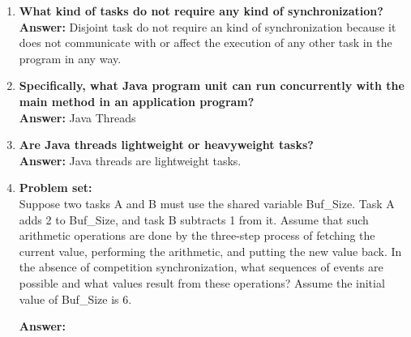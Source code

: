 \documentclass{article}
\begin{document}
\begin{enumerate}[(1)]
\item 
\textbf{What kind of tasks do not require any kind of synchronization?}\\
\textbf{Answer: } Disjoint task do not require an kind of synchronization because it does not communicate with or affect the execution of any other task in the program in any way.

\item 
\textbf{Specifically, what Java program unit can run concurrently with the main method in an application program?}\\
\textbf{Answer: } Java Threads  

\item 
\textbf{Are Java threads lightweight or heavyweight tasks?}\\
\textbf{Answer:} Java threads are lightweight tasks.

\item 
\textbf{Problem set:}\\
 Suppose two tasks A and B must use the shared variable Buf\_Size. Task A adds 2 to Buf\_Size, and task B subtracts 1 from it. Assume that such arithmetic operations are done by the three-step process of fetching the current value, performing the arithmetic, and putting the new value back. In the absence of competition synchronization, what sequences of events are possible and what values result from these operations? Assume the initial value of Buf\_Size is 6.

\textbf{Answer: }  

\end{enumerate}
\end{document}
